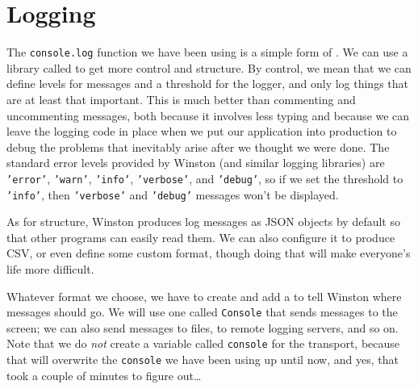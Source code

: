 \chapter{Logging}\label{s:logging}

The \texttt{console.log} function we have been using
is a simple form of .
We can use a library called  to get more control and structure.
By control,
we mean that we can define levels for messages and a threshold for the logger,
and only log things that are at least that important.
This is much better than commenting and uncommenting messages,
both because it involves less typing
and because we can leave the logging code in place when we put our application into production
to debug the problems that inevitably arise after we thought we were done.
The standard error levels provided by Winston (and similar logging libraries)
are \texttt{'error'}, \texttt{'warn'}, \texttt{'info'}, \texttt{'verbose'}, and \texttt{'debug'},
so if we set the threshold to \texttt{'info'},
then \texttt{'verbose'} and \texttt{'debug'} messages won't be displayed.

As for structure,
Winston produces log messages as JSON objects by default
so that other programs can easily read them.
We can also configure it to produce CSV,
or even define some custom format,
though doing that will make everyone's life more difficult.

Whatever format we choose,
we have to create and add a  to tell Winston where messages should go.
We will use one called \texttt{Console} that sends messages to the screen;
we can also send messages to files, to remote logging servers, and so on.
Note that we do \emph{not} create a variable called \texttt{console} for the transport,
because that will overwrite the \texttt{console} we have been using up until now,
and yes, that took a couple of minutes to figure out{\ldots}

